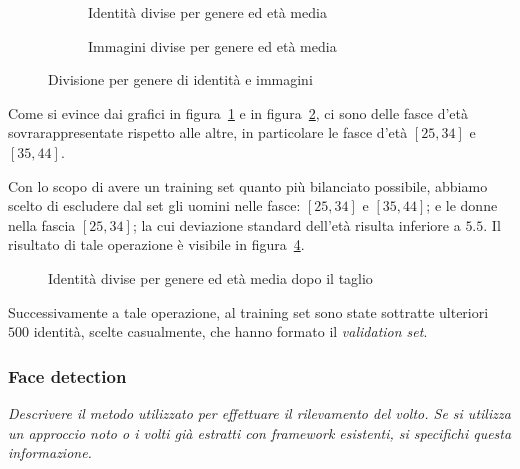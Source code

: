\begin{figure}[H]

\begin{subfigure}{0.5\textwidth}
\def\svgscale{0.42}

\caption{Identità divise per genere ed età media}
\label{sfig:Ids per gender and mean age}
\end{subfigure}
\begin{subfigure}{0.5\textwidth}
\def\svgscale{0.42}

\caption{Immagini divise per genere ed età media}
\label{sfig:Images per gender and mean age}
\end{subfigure}
\caption{Divisione per genere di identità e immagini}
\label{fig:gender_age_division}
\end{figure}

Come si evince dai grafici in figura~\ref{sfig:Ids per gender and mean age} e in figura~\ref{sfig:Images per gender and mean age}, ci sono delle fasce d'età sovrarappresentate rispetto alle altre, in particolare le fasce d'età $[25,34]$ e $[35,44]$.

Con lo scopo di avere un training set quanto più bilanciato possibile, abbiamo scelto di escludere dal set gli uomini nelle fasce: $[25,34]$ e $[35,44]$; e le donne nella fascia $[25,34]$; la cui deviazione standard dell'età risulta inferiore a $5.5$. Il risultato di tale operazione è visibile in figura~\ref{fig:Ids per gender and mean age after the drop}.

\begin{figure}[H]
\centering
\def\svgscale{0.7}

\caption{Identità divise per genere ed età media dopo il taglio}
\label{fig:Ids per gender and mean age after the drop}
\end{figure}

Successivamente a tale operazione, al training set sono state sottratte ulteriori $500$ identità, scelte casualmente, che hanno formato il \emph{validation set}.

\subsubsection{Face detection}
\label{subsubsec:face_detection}

\emph{Descrivere il metodo utilizzato per effettuare il rilevamento del volto. Se si utilizza un approccio noto o i volti già estratti con framework esistenti, si specifichi questa informazione.}

